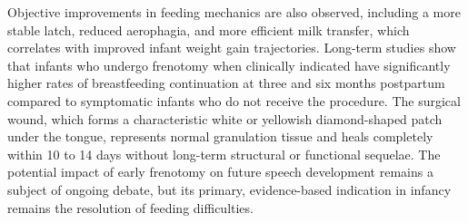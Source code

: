 Objective improvements in feeding mechanics are also observed, including a more stable latch, reduced aerophagia, and more efficient milk transfer, which correlates with improved infant weight gain trajectories. Long-term studies show that infants who undergo frenotomy when clinically indicated have significantly higher rates of breastfeeding continuation at three and six months postpartum compared to symptomatic infants who do not receive the procedure. The surgical wound, which forms a characteristic white or yellowish diamond-shaped patch under the tongue, represents normal granulation tissue and heals completely within 10 to 14 days without long-term structural or functional sequelae. The potential impact of early frenotomy on future speech development remains a subject of ongoing debate, but its primary, evidence-based indication in infancy remains the resolution of feeding difficulties.

